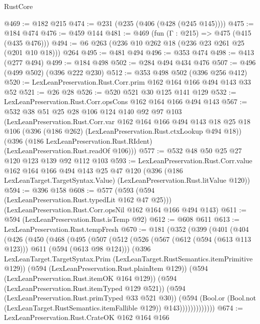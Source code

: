 \begin{lexlean}{RustCore}
\begin{coremodule}
@469 := @182 @215
@474 := @231 (@235 (@406 (@428 (@245 @145))))
@475 := @184 @474
@476 := @459 @144
@481 := @469 (fun (Γ : @215) => @475 (@415 (@435 @476)))
@494 := @6 @263 (@236 @10 @262 @18 (@236 @23 @261 @25 (@201 @10 @18))) @264
@495 := @481 @494
@496 := @353 @474
@498 := @413 (@277 @494)
@499 := @184 @498
@502 := @284 @494 @434 @476
@507 := @496 (@499 @502) (@396 @222 @230)
@512 := @353 @498 @502 (@396 @256 @412)
@520 := LexLeanPreservation.Rust.Corr.prim @162 @164 @166 @494 @143 @33 @52
@521 := @26 @28
@526 := @520 @521 @30 @125 @141 @129
@532 := LexLeanPreservation.Rust.Corr.opsCons @162 @164 @166 @494 @143
@567 := @532
    @38
    @51
    @25
    @28
    @106
    @124
    @140
    @92
    @97
    @103
    (LexLeanPreservation.Rust.Corr.var
      @162
      @164
      @166
      @494
      @143
      @18
      @25
      @18
      @106
      (@396 (@186 @262) (LexLeanPreservation.Rust.ctxLookup @494 @18))
      (@396 (@186 LexLeanPreservation.Rust.RIdent) (LexLeanPreservation.Rust.readOf @106)))
@577 := @532 @48 @50 @25 @27 @120 @123 @139 @92 @112 @103
@593 := LexLeanPreservation.Rust.Corr.value
    @162
    @164
    @166
    @494
    @143
    @25
    @47
    @120
    (@396 (@186 LexLeanTarget.TargetSyntax.Value) (LexLeanPreservation.Rust.litValue @120))
@594 := @396 @158
@608 := @577
    (@593 (@594 (LexLeanPreservation.Rust.typedLit @162 @47 @25)))
    (LexLeanPreservation.Rust.Corr.opsNil @162 @164 @166 @494 @143)
@611 := @594 (LexLeanPreservation.Rust.isTemp @92)
@612 := @608 @611
@613 := LexLeanPreservation.Rust.tempFresh
@670 := @181
    (@352
      (@399
        (@401
          (@404
            (@426
              (@450
                (@468
                  (@495
                    (@507
                      (@512
                        (@526
                          (@567 (@612 (@594 (@613 @113 @123))) @611 (@594 (@613 @98 @124)))
                          (@396
                            LexLeanTarget.TargetSyntax.Prim
                            (LexLeanTarget.RustSemantics.itemPrimitive @129))
                          (@594 (LexLeanPreservation.Rust.plainItem @129))
                          (@594 (LexLeanPreservation.Rust.itemOK @164 @129))
                          (@594 (LexLeanPreservation.Rust.itemTyped @129 @521))
                          (@594 (LexLeanPreservation.Rust.primTyped @33 @521 @30))
                          (@594
                            (Bool.or
                              (Bool.not (LexLeanTarget.RustSemantics.itemFallible @129))
                              @143)))))))))))))
@674 := LexLeanPreservation.Rust.CrateOK @162 @164 @166

\end{coremodule}
\end{lexlean}
